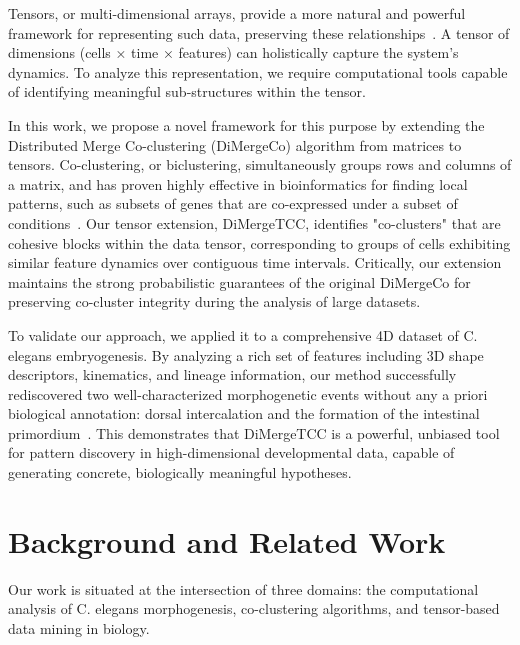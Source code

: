 \documentclass[unnumsec,webpdf,modern,large,namedate]{oup-authoring-template}%
\theoremstyle{thmstyleone}%
\theoremstyle{thmstyletwo}%
\theoremstyle{thmstylethree}%
\begin{document}
Tensors, or multi-dimensional arrays, provide a more natural and powerful framework for representing such data, preserving these relationships~\citep{sun2008IncrementalTensorAnalysis}. A tensor of dimensions (cells × time × features) can holistically capture the system's dynamics. To analyze this representation, we require computational tools capable of identifying meaningful sub-structures within the tensor.

In this work, we propose a novel framework for this purpose by extending the Distributed Merge Co-clustering (DiMergeCo) algorithm from matrices to tensors. Co-clustering, or biclustering, simultaneously groups rows and columns of a matrix, and has proven highly effective in bioinformatics for finding local patterns, such as subsets of genes that are co-expressed under a subset of conditions~\citep{zapala2006MultivariateRegressionAnalysis}. Our tensor extension, DiMergeTCC, identifies "co-clusters" that are cohesive blocks within the data tensor, corresponding to groups of cells exhibiting similar feature dynamics over contiguous time intervals. Critically, our extension maintains the strong probabilistic guarantees of the original DiMergeCo for preserving co-cluster integrity during the analysis of large datasets.

To validate our approach, we applied it to a comprehensive 4D dataset of C. elegans embryogenesis. By analyzing a rich set of features including 3D shape descriptors, kinematics, and lineage information, our method successfully rediscovered two well-characterized morphogenetic events without any a priori biological annotation: dorsal intercalation and the formation of the intestinal primordium~\citep{bao2006AutomatedCellLineage,kaletta1997BinarySpecificationEmbryonic,artal-sanz2006CaenorhabditisElegansVersatile,sato2015LeftRightAsymmetric,stoeckius2009LargescaleSortingElegans}. This demonstrates that DiMergeTCC is a powerful, unbiased tool for pattern discovery in high-dimensional developmental data, capable of generating concrete, biologically meaningful hypotheses.

\section{Background and Related Work}

Our work is situated at the intersection of three domains: the computational analysis of C. elegans morphogenesis, co-clustering algorithms, and tensor-based data mining in biology.
\end{document}
